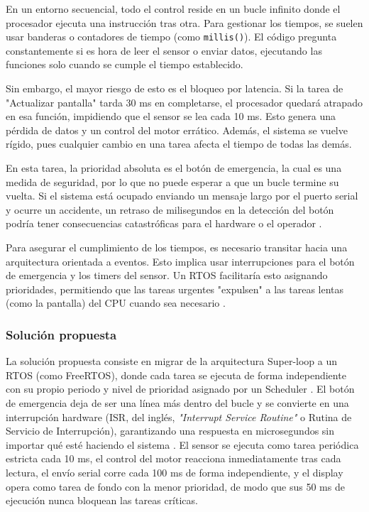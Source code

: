 En un entorno secuencial, todo el control reside en un bucle infinito donde el procesador ejecuta una instrucción tras otra. Para gestionar los tiempos, se suelen usar banderas o contadores de tiempo (como \texttt{millis()}). El código pregunta constantemente si es hora de leer el sensor o enviar datos, ejecutando las funciones solo cuando se cumple el tiempo establecido.

Sin embargo, el mayor riesgo de esto es el bloqueo por latencia. Si la tarea de "Actualizar pantalla" tarda 30 ms en completarse, el procesador quedará atrapado en esa función, impidiendo que el sensor se lea cada 10 ms. Esto genera una pérdida de datos y un control del motor errático. Además, el sistema se vuelve rígido, pues cualquier cambio en una tarea afecta el tiempo de todas las demás.

En esta tarea, la prioridad absoluta es el botón de emergencia, la cual es una medida de seguridad, por lo que no puede esperar a que un bucle termine su vuelta. Si el sistema está ocupado enviando un mensaje largo por el puerto serial y ocurre un accidente, un retraso de milisegundos en la detección del botón podría tener consecuencias catastróficas para el hardware o el operador \cite{verdugamonar_2025_controladores}.

Para asegurar el cumplimiento de los tiempos, es necesario transitar hacia una arquitectura orientada a eventos. Esto implica usar interrupciones para el botón de emergencia y los timers del sensor. Un RTOS facilitaría esto asignando prioridades, permitiendo que las tareas urgentes "expulsen" a las tareas lentas (como la pantalla) del CPU cuando sea necesario \cite{wirth_2022_superloop} \cite{verdugamonar_2025_controladores}.

\subsubsection{Solución propuesta}

La solución propuesta consiste en migrar de la arquitectura Super-loop a un RTOS (como FreeRTOS), donde cada tarea se ejecuta de forma independiente con su propio periodo y nivel de prioridad asignado por un Scheduler \cite{wirth_2022_superloop} \cite{verdugamonar_2025_controladores}. El botón de emergencia deja de ser una línea más dentro del bucle y se convierte en una interrupción hardware (ISR, del inglés, \textit{"Interrupt Service Routine"} o Rutina de Servicio de Interrupción), garantizando una respuesta en microsegundos sin importar qué esté haciendo el sistema \cite{wirth_2022_superloop}. El sensor se ejecuta como tarea periódica estricta cada 10 ms, el control del motor reacciona inmediatamente tras cada lectura, el envío serial corre cada 100 ms de forma independiente, y el display opera como tarea de fondo con la menor prioridad, de modo que sus 50 ms de ejecución nunca bloquean las tareas críticas. 

